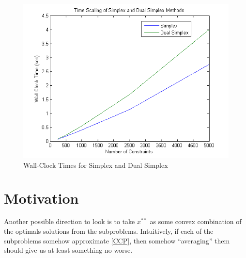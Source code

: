 \documentclass[12pt]{article}
\begin{document}
\begin{figure}[ht]
	\centering
		\includegraphics{../plot/figs/fig_simplex_time.png}
	\caption{Wall-Clock Times for Simplex and Dual Simplex}
	\label{fig:fig_simplex_time}
\end{figure}



\section*{Motivation}

Another possible direction to look is to take $x^{**}$ as some convex combination of the
optimals solutions from the subproblems.  Intuitively, if each of the subproblems somehow
approximate \ref{CCP}, then somehow ``averaging'' them should give us at least something
no worse.
\end{document}
